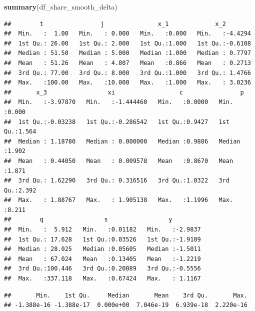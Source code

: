\documentclass[]{book}
\newenvironment{Shaded}{\begin{snugshade}}{\end{snugshade}}
\newcommand{\KeywordTok}[1]{\textcolor[rgb]{0.13,0.29,0.53}{\textbf{#1}}}
\newcommand{\StringTok}[1]{\textcolor[rgb]{0.31,0.60,0.02}{#1}}
\newcommand{\OperatorTok}[1]{\textcolor[rgb]{0.81,0.36,0.00}{\textbf{#1}}}
\newcommand{\NormalTok}[1]{#1}
\begin{document}
\begin{Shaded}
\begin{Highlighting}[]
\KeywordTok{summary}\NormalTok{(df_share_smooth_delta)}
\end{Highlighting}
\end{Shaded}

\begin{verbatim}
##        t                j               x_1             x_2         
##  Min.   :  1.00   Min.   : 0.000   Min.   :0.000   Min.   :-4.4294  
##  1st Qu.: 26.00   1st Qu.: 2.000   1st Qu.:1.000   1st Qu.:-0.6108  
##  Median : 51.50   Median : 5.000   Median :1.000   Median : 0.7797  
##  Mean   : 51.26   Mean   : 4.807   Mean   :0.866   Mean   : 0.2713  
##  3rd Qu.: 77.00   3rd Qu.: 8.000   3rd Qu.:1.000   3rd Qu.: 1.4766  
##  Max.   :100.00   Max.   :10.000   Max.   :1.000   Max.   : 3.0236  
##       x_3                 xi                  c                p        
##  Min.   :-3.97870   Min.   :-1.444460   Min.   :0.0000   Min.   :0.000  
##  1st Qu.:-0.03238   1st Qu.:-0.286542   1st Qu.:0.9427   1st Qu.:1.564  
##  Median : 1.18780   Median : 0.000000   Median :0.9886   Median :1.902  
##  Mean   : 0.44050   Mean   : 0.009578   Mean   :0.8670   Mean   :1.871  
##  3rd Qu.: 1.62290   3rd Qu.: 0.316516   3rd Qu.:1.0322   3rd Qu.:2.392  
##  Max.   : 1.88767   Max.   : 1.905138   Max.   :1.1996   Max.   :8.211  
##        q                 s                 y          
##  Min.   :  5.912   Min.   :0.01182   Min.   :-2.9837  
##  1st Qu.: 17.628   1st Qu.:0.03526   1st Qu.:-1.9109  
##  Median : 28.025   Median :0.05605   Median :-1.5011  
##  Mean   : 67.024   Mean   :0.13405   Mean   :-1.2219  
##  3rd Qu.:100.446   3rd Qu.:0.20089   3rd Qu.:-0.5556  
##  Max.   :337.118   Max.   :0.67424   Max.   : 1.1167
\end{verbatim}

\begin{Shaded}
\end{Shaded}

\begin{verbatim}
##       Min.    1st Qu.     Median       Mean    3rd Qu.       Max. 
## -1.388e-16 -1.388e-17  0.000e+00  7.046e-19  6.939e-18  2.220e-16
\end{verbatim}
\end{document}
